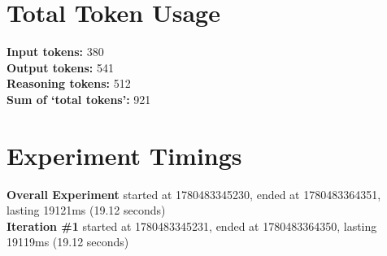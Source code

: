 \documentclass{article}
\begin{document}
\section*{Total Token Usage}
\textbf{Input tokens: }380
\\\textbf{Output tokens: }541
\\\textbf{Reasoning tokens: }512
\\\textbf{Sum of `total tokens': }921
\section*{Experiment Timings}
\textbf{Overall Experiment} started at 1780483345230, ended at 1780483364351, lasting 19121ms (19.12 seconds)
\\\textbf{Iteration \#1} started at 1780483345231, ended at 1780483364350, lasting 19119ms (19.12 seconds)
\end{document}
